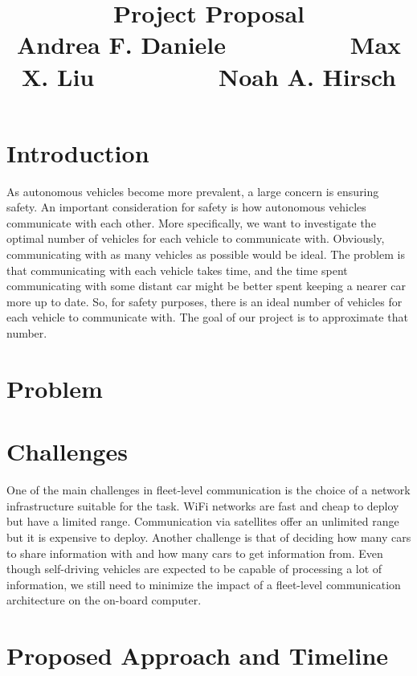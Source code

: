 \documentclass{article}
\title{Project Proposal\vspace{-6pt}\\{\large Andrea F. Daniele $\hspace{2cm}$ Max X. Liu $\hspace{2cm}$ Noah A. Hirsch }}
\begin{document}
\maketitle


\vspace{-1.2cm}

\section*{Introduction}
\vspace{-.3cm}
As autonomous vehicles become more prevalent, a large concern is ensuring safety. An important consideration for safety is how autonomous vehicles communicate with each other. More specifically, we want to investigate the optimal number of vehicles for each vehicle to communicate with. Obviously, communicating with as many vehicles as possible would be ideal. The problem is that communicating with each vehicle takes time, and the time spent communicating with some distant car might be better spent keeping a nearer car more up to date. So, for safety purposes, there is an ideal number of vehicles for each vehicle to communicate with. The goal of our project is to approximate that number.


\section*{Problem}
\vspace{-.3cm}

\section*{Challenges}
\vspace{-.3cm}
One of the main challenges in fleet-level communication is the choice of a network infrastructure suitable
for the task. WiFi networks are fast and cheap to deploy but have a limited range. Communication via satellites
offer an unlimited range but it is expensive to deploy. Another challenge is that of deciding how many cars
to share information with and how many cars to get information from. Even though self-driving vehicles are
expected to be capable of processing a lot of information, we still need to minimize the impact of a fleet-level
communication architecture on the on-board computer.

\section*{Proposed Approach and Timeline}
\vspace{-.3cm}




%
%
\end{document}
